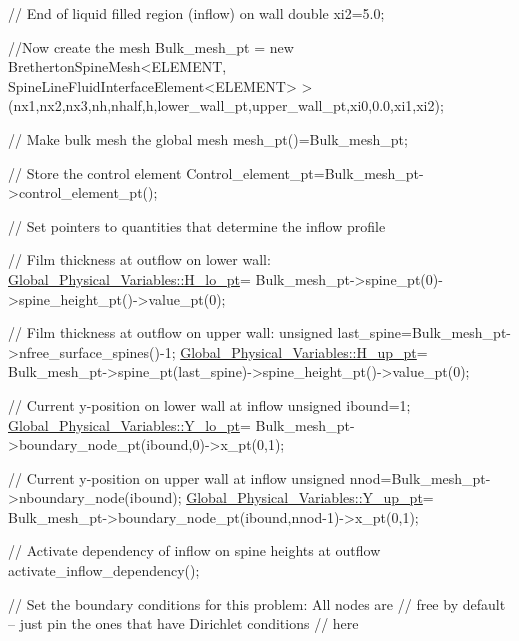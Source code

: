 \begin{DoxyCodeInclude}
 \textcolor{comment}{// End of liquid filled region (inflow) on wall}
 \textcolor{keywordtype}{double} xi2=5.0;

 \textcolor{comment}{//Now create the mesh}
 Bulk\_mesh\_pt = \textcolor{keyword}{new}  BrethertonSpineMesh<ELEMENT,
  SpineLineFluidInterfaceElement<ELEMENT> > 
  (nx1,nx2,nx3,nh,nhalf,h,lower\_wall\_pt,upper\_wall\_pt,xi0,0.0,xi1,xi2);

 \textcolor{comment}{// Make bulk mesh the global mesh}
 mesh\_pt()=Bulk\_mesh\_pt;

 \textcolor{comment}{// Store the control element}
 Control\_element\_pt=Bulk\_mesh\_pt->control\_element\_pt();


 \textcolor{comment}{// Set pointers to quantities that determine the inflow profile}

 \textcolor{comment}{// Film thickness at outflow on lower wall:}
 \hyperlink{namespaceGlobal__Physical__Variables_a137bdac2ad4b72a03ec9916e8ee7395b}{Global\_Physical\_Variables::H\_lo\_pt}=
  Bulk\_mesh\_pt->spine\_pt(0)->spine\_height\_pt()->value\_pt(0);

 \textcolor{comment}{// Film thickness at outflow on upper wall:}
 \textcolor{keywordtype}{unsigned} last\_spine=Bulk\_mesh\_pt->nfree\_surface\_spines()-1;
 \hyperlink{namespaceGlobal__Physical__Variables_a83a3a82f89784013805bd23d63faa7e3}{Global\_Physical\_Variables::H\_up\_pt}=
  Bulk\_mesh\_pt->spine\_pt(last\_spine)->spine\_height\_pt()->value\_pt(0);

 \textcolor{comment}{// Current y-position on lower wall at inflow}
 \textcolor{keywordtype}{unsigned} ibound=1;
 \hyperlink{namespaceGlobal__Physical__Variables_a84caa2a64e50ba5b390a3cd100f0f835}{Global\_Physical\_Variables::Y\_lo\_pt}=
  Bulk\_mesh\_pt->boundary\_node\_pt(ibound,0)->x\_pt(0,1);

 \textcolor{comment}{// Current y-position on upper wall at inflow}
 \textcolor{keywordtype}{unsigned} nnod=Bulk\_mesh\_pt->nboundary\_node(ibound);
 \hyperlink{namespaceGlobal__Physical__Variables_a75878a0c79c88065fd9031f273b62698}{Global\_Physical\_Variables::Y\_up\_pt}=
  Bulk\_mesh\_pt->boundary\_node\_pt(ibound,nnod-1)->x\_pt(0,1);

 \textcolor{comment}{// Activate dependency of inflow on spine heights at outflow}
 activate\_inflow\_dependency();

 \textcolor{comment}{// Set the boundary conditions for this problem: All nodes are}
 \textcolor{comment}{// free by default -- just pin the ones that have Dirichlet conditions}
 \textcolor{comment}{// here}


\end{DoxyCodeInclude}
